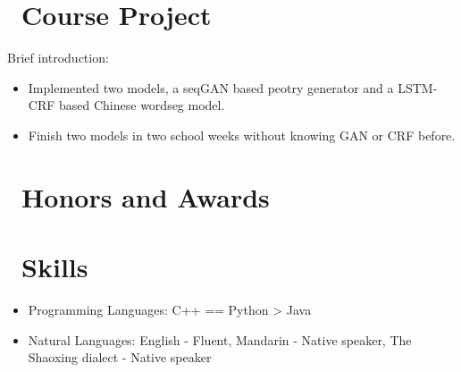 \documentclass{resume}
\begin{document}
\section{\faUsers\ Course Project}
Brief introduction: 
\begin{itemize}
  \item Implemented two models, a seqGAN based peotry generator and a LSTM-CRF based Chinese wordseg model.
  \item Finish two models in two school weeks without knowing GAN or CRF before.
\end{itemize}

\section{\faHeartO\ Honors and Awards}

\section{\faCogs\ Skills}
\begin{itemize}[parsep=0.5ex]
  \item Programming Languages: C++ == Python > Java
  \item Natural Languages: English - Fluent, Mandarin - Native speaker, The Shaoxing dialect - Native speaker
\end{itemize}


%
%
\end{document}
